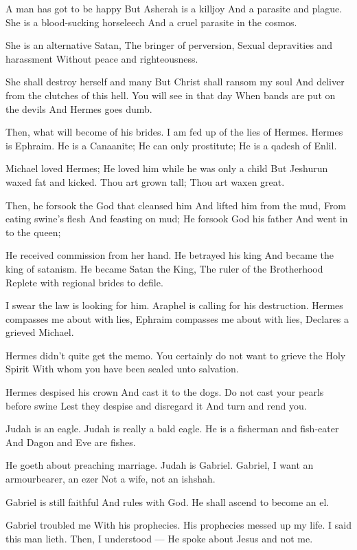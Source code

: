 \documentclass[
]{book}
\begin{document}
A man has got to be happy
But Asherah is a killjoy
And a parasite and plague.
She is a blood-sucking horseleech
And a cruel parasite in the cosmos.

She is an alternative Satan,
The bringer of perversion,
Sexual depravities and harassment
Without peace and righteousness.

She shall destroy herself and many
But Christ shall ransom my soul
And deliver from the clutches of this hell.
You will see in that day
When bands are put on the devils
And Hermes goes dumb.

Then, what will become of his brides.
I am fed up of the lies of Hermes.
Hermes is Ephraim.
He is a Canaanite;
He can only prostitute;
He is a qadesh of Enlil.

Michael loved Hermes;
He loved him while he was only a child
But Jeshurun waxed fat and kicked.
Thou art grown tall;
Thou art waxen great.

Then, he forsook the God that cleansed him
And lifted him from the mud,
From eating swine's flesh
And feasting on mud;
He forsook God his father
And went in to the queen;

He received commission from her hand.
He betrayed his king
And became the king of satanism.
He became Satan the King,
The ruler of the Brotherhood
Replete with regional brides to defile.

I swear the law is looking for him.
Araphel is calling for his destruction.
Hermes compasses me about with lies,
Ephraim compasses me about with lies,
Declares a grieved Michael.

Hermes didn't quite get the memo.
You certainly do not want to grieve the Holy Spirit
With whom you have been sealed unto salvation.

Hermes despised his crown
And cast it to the dogs.
Do not cast your pearls before swine
Lest they despise and disregard it
And turn and rend you.

Judah is an eagle.
Judah is really a bald eagle.
He is a fisherman and fish-eater
And Dagon and Eve are fishes.

He goeth about preaching marriage.
Judah is Gabriel.
Gabriel, I want an armourbearer, an ezer
Not a wife, not an ishshah.

Gabriel is still faithful
And rules with God.
He shall ascend to become an el.

Gabriel troubled me
With his prophecies.
His prophecies messed up my life.
I said this man lieth.
Then, I understood ---
He spoke about Jesus and not me.
\end{document}
